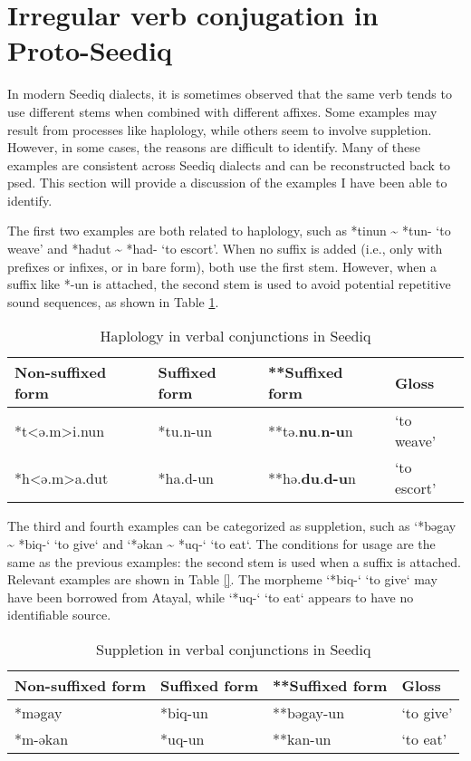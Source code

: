 \section{Irregular verb conjugation in Proto-Seediq} \label{sec:psed_irr_v}

In modern Seediq dialects, it is sometimes observed that the same verb tends to use different stems when combined with different affixes. Some examples may result from processes like haplology, while others seem to involve suppletion. However, in some cases, the reasons are difficult to identify. Many of these examples are consistent across Seediq dialects and can be reconstructed back to \acl{psed}. This section will provide a discussion of the examples I have been able to identify.

The first two examples are both related to haplology, such as *tinun \~{} *tun- `to weave' and *hadut \~{} *had- `to escort'. When no suffix is added (i.e., only with prefixes or infixes, or in bare form), both use the first stem. However, when a suffix like *-un is attached, the second stem is used to avoid potential repetitive sound sequences, as shown in Table \ref{tab:psed_hap}.

\begin{table}[!htbp]
\centering
\caption{Haplology in verbal conjunctions in Seediq}
\label{tab:psed_hap}
\begin{tabular}{llll}
\hline
Non-suffixed form & Suffixed form & **Suffixed form & Gloss       \\ \hline
*t<ə.m>i.nun        & *tu.n-un       & **tə.\textbf{nu}.\textbf{n-u}n      & `to weave'  \\
*h<ə.m>a.dut        & *ha.d-un       & **hə.\textbf{du}.\textbf{d-u}n      & `to escort' \\ \hline
\end{tabular}
\end{table}

The third and fourth examples can be categorized as suppletion, such as `*bəgay \~{} *biq-` `to give` and `*əkan \~{} *uq-` `to eat`. The conditions for usage are the same as the previous examples: the second stem is used when a suffix is attached. Relevant examples are shown in Table \ref{}. The morpheme `*biq-` `to give` may have been borrowed from Atayal, while `*uq-` `to eat` appears to have no identifiable source.

\begin{table}[!htbp]
\centering
\caption{Suppletion in verbal conjunctions in Seediq}
\label{tab:psed_supp}
\begin{tabular}{llll}
\hline
Non-suffixed form & Suffixed form & **Suffixed form & Gloss     \\ \hline
*məgay            & *biq-un       & **bəgay-un      & `to give' \\
*m-əkan           & *uq-un        & **kan-un        & `to eat'  \\ \hline
\end{tabular}
\end{table}

